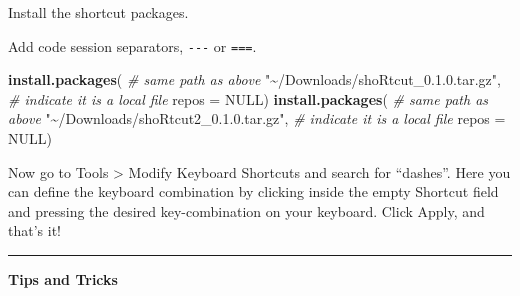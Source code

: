 \documentclass[
]{book}
\newenvironment{Shaded}{\begin{snugshade}}{\end{snugshade}}
\newcommand{\AttributeTok}[1]{\textcolor[rgb]{0.13,0.29,0.53}{#1}}
\newcommand{\CommentTok}[1]{\textcolor[rgb]{0.56,0.35,0.01}{\textit{#1}}}
\newcommand{\ConstantTok}[1]{\textcolor[rgb]{0.56,0.35,0.01}{#1}}
\newcommand{\FunctionTok}[1]{\textcolor[rgb]{0.13,0.29,0.53}{\textbf{#1}}}
\newcommand{\NormalTok}[1]{#1}
\newcommand{\StringTok}[1]{\textcolor[rgb]{0.31,0.60,0.02}{#1}}
\theoremstyle{definition}
\theoremstyle{definition}
\theoremstyle{definition}
\theoremstyle{definition}
\theoremstyle{remark}
\begin{document}
Install the shortcut packages.

Add code session separators, \texttt{-\/-\/-} or \texttt{===}.

\begin{Shaded}
\begin{Highlighting}[]
\FunctionTok{install.packages}\NormalTok{(}
    \CommentTok{\# same path as above}
  \StringTok{"\textasciitilde{}/Downloads/shoRtcut\_0.1.0.tar.gz"}\NormalTok{, }
  \CommentTok{\# indicate it is a local file}
  \AttributeTok{repos =} \ConstantTok{NULL}\NormalTok{)}
\FunctionTok{install.packages}\NormalTok{(}
    \CommentTok{\# same path as above}
  \StringTok{"\textasciitilde{}/Downloads/shoRtcut2\_0.1.0.tar.gz"}\NormalTok{, }
  \CommentTok{\# indicate it is a local file}
  \AttributeTok{repos =} \ConstantTok{NULL}\NormalTok{)}
\end{Highlighting}
\end{Shaded}

Now go to Tools \textgreater{} Modify Keyboard Shortcuts and search for ``dashes''. Here you can define the keyboard combination by clicking inside the empty Shortcut field and pressing the desired key-combination on your keyboard. Click Apply, and that's it!

\begin{center}\rule{0.5\linewidth}{0.5pt}\end{center}

\textbf{Tips and Tricks}
\end{document}
